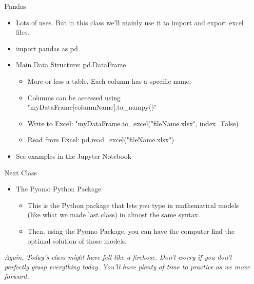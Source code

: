 \documentclass[10pt, aspectratio=169]{beamer}
\begin{document}
\begin{frame}{Pandas}
    \begin{itemize}
        \item Lots of uses. But in this class we'll mainly use it to import and export excel files.
        \item import pandas as pd
        \item Main Data Structure: pd.DataFrame
        \begin{itemize}
            \item More or less a table. Each column has a specific name.
            \item Columns can be accessed using "myDataFrame[columnName].to\_numpy()"
            \item Write to Excel: "myDataFrame.to\_excel("fileName.xlsx", index=False)
            \item Read from Excel: pd.read\_excel("fileName.xlsx")
        \end{itemize}
        \item See examples in the Jupyter Notebook
    \end{itemize}
\end{frame}

\begin{frame}{Next Class}
    \begin{itemize}
        \item The Pyomo Python Package
        \begin{itemize}
            \item This is the Python package that lets you type in mathematical models (like what we made last class) in almost the same syntax.
            \item Then, using the Pyomo Package, you can have the computer find the optimal solution of those models.
        \end{itemize}
    \end{itemize}

    \vspace{1cm}

    \textit{Again, Today's class might have felt like a firehose. Don't worry if you don't perfectly grasp everything today. You'll have plenty of time to practice as we move forward.}

\end{frame}
\end{document}
